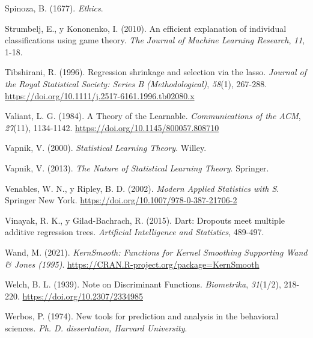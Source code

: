 \documentclass[
]{book}
\newlength{\cslhangindent}
\newlength{\cslentryspacingunit} %
\newenvironment{CSLReferences}[2] %
 {%
  \setlength{\parindent}{0pt}
  \ifodd #1
  \let\oldpar\par
  \def\par{\hangindent=\cslhangindent\oldpar}
  \fi
  \setlength{\parskip}{#2\cslentryspacingunit}
 }%
 {}
\theoremstyle{break}
\theoremstyle{nonumberplain}
\begin{document}
\begin{CSLReferences}{1}{0}
\leavevmode{}%
Spinoza, B. (1677). \emph{Ethics}.

\leavevmode{}%
Strumbelj, E., y Kononenko, I. (2010). An efficient explanation of individual classifications using game theory. \emph{The Journal of Machine Learning Research}, \emph{11}, 1-18.

\leavevmode{}%
Tibshirani, R. (1996). Regression shrinkage and selection via the lasso. \emph{Journal of the Royal Statistical Society: Series B (Methodological)}, \emph{58}(1), 267-288. \url{https://doi.org/10.1111/j.2517-6161.1996.tb02080.x}

\leavevmode{}%
Valiant, L. G. (1984). A Theory of the Learnable. \emph{Communications of the ACM}, \emph{27}(11), 1134-1142. \url{https://doi.org/10.1145/800057.808710}

\leavevmode{}%
Vapnik, V. (2000). \emph{Statistical Learning Theory}. Willey.

\leavevmode{}%
Vapnik, V. (2013). \emph{The Nature of Statistical Learning Theory}. Springer.

\leavevmode{}%
Venables, W. N., y Ripley, B. D. (2002). \emph{Modern Applied Statistics with S}. Springer New York. \url{https://doi.org/10.1007/978-0-387-21706-2}

\leavevmode{}%
Vinayak, R. K., y Gilad-Bachrach, R. (2015). Dart: Dropouts meet multiple additive regression trees. \emph{Artificial Intelligence and Statistics}, 489-497.

\leavevmode{}%
Wand, M. (2021). \emph{KernSmooth: Functions for Kernel Smoothing Supporting Wand \& Jones (1995)}. \url{https://CRAN.R-project.org/package=KernSmooth}

\leavevmode{}%
Welch, B. L. (1939). Note on Discriminant Functions. \emph{Biometrika}, \emph{31}(1/2), 218-220. \url{https://doi.org/10.2307/2334985}

\leavevmode{}%
Werbos, P. (1974). New tools for prediction and analysis in the behavioral sciences. \emph{Ph. D. dissertation, Harvard University}.


\end{CSLReferences}
\end{document}
